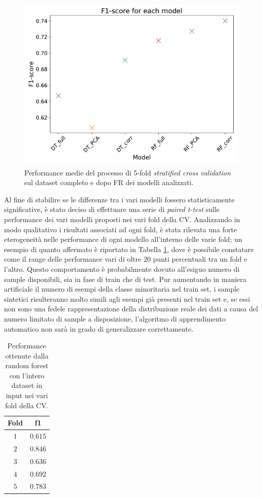 \begin{figure}
	\centering
	\includegraphics[width=1\linewidth]{images/fscore}
	\caption{Performance medie del processo di 5-fold \textit{stratified cross validation} sul dataset completo e dopo FR dei modelli analizzati.}
	\label{fig:fscore}
\end{figure}
Al fine di stabilire se le differenze tra i vari modelli fossero statisticamente significative, è stato deciso di effettuare una serie di \textit{paired t-test} sulle performance dei vari modelli proposti nei vari fold della CV.
Analizzando in modo qualitativo i risultati associati ad ogni fold, è stata rilevata una forte eterogeneità nelle performance di ogni modello all'interno delle varie fold; un esempio di quanto affermato è riportato in Tabella \ref{tab:f1fold}, dove è possibile constatare come il range delle performance vari di oltre $20$ punti percentuali tra un fold e l'altro. Questo comportamento è probabilmente dovuto all'esiguo numero di sample disponibili, sia in fase di train che di test. Pur aumentando in maniera artificiale il numero di esempi della classe minoritaria nel train set, i sample sintetici risulteranno molto simili agli esempi già presenti nel train set e, se essi non sono una fedele rappresentazione della distribuzione reale dei dati a causa del numero limitato di sample a disposizione, l'algoritmo di apprendimento automatico non sarà in grado di generalizzare correttamente. 
\begin{table}
	\centering
	\caption{Performance ottenute dalla random forest con l'intero dataset in input nei vari fold della CV.}
	\label{tab:f1fold}
	\begin{tabular}{|c|c|}
		\hline 
		Fold & f1 \\ 
		\hline 
		$1$ & $0.615$ \\ 
		\hline 
		$2$ & $0.846$ \\ 
		\hline 
		$3$ & $0.636$ \\ 
		\hline 
		$4$ & $0.692$ \\ 
		\hline 
		$5$ & $0.783$ \\ 
		\hline 
	\end{tabular} 
\end{table}
